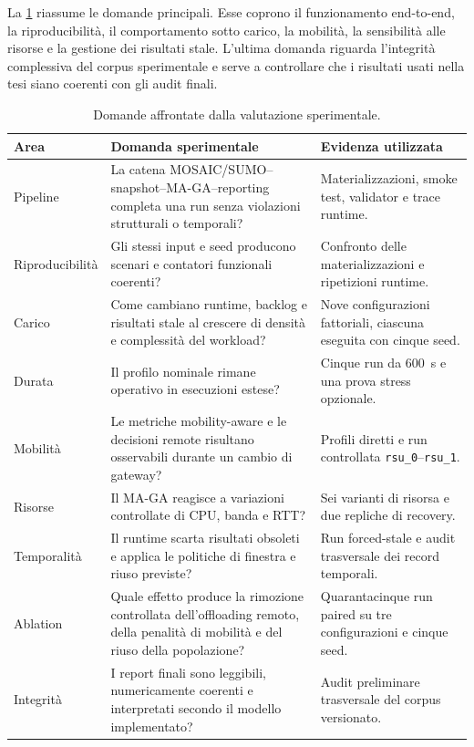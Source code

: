 La \cref{tab:exp_domande} riassume le domande principali. Esse coprono il funzionamento end-to-end, la riproducibilità, il comportamento sotto carico, la mobilità, la sensibilità alle risorse e la gestione dei risultati stale. L'ultima domanda riguarda l'integrità complessiva del corpus sperimentale e serve a controllare che i risultati usati nella tesi siano coerenti con gli audit finali.

\begin{table}[htbp]
    \centering
    \caption{Domande affrontate dalla valutazione sperimentale.}
    \label{tab:exp_domande}
    \small
    \begin{tabularx}{\textwidth}{
        >{\raggedright\arraybackslash}p{}
        >{\raggedright\arraybackslash}X
        >{\raggedright\arraybackslash}p{}
    }
        \toprule
        \textbf{Area} &
        \textbf{Domanda sperimentale} &
        \textbf{Evidenza utilizzata} \\
        \midrule
        Pipeline &
        La catena MOSAIC/SUMO--snapshot--MA-GA--reporting completa una run senza violazioni strutturali o temporali? &
        Materializzazioni, smoke test, validator e trace runtime. \\
        Riproducibilità &
        Gli stessi input e seed producono scenari e contatori funzionali coerenti? &
        Confronto delle materializzazioni e ripetizioni runtime. \\
        Carico &
        Come cambiano runtime, backlog e risultati stale al crescere di densità e complessità del workload? &
        Nove configurazioni fattoriali, ciascuna eseguita con cinque seed. \\
        Durata &
        Il profilo nominale rimane operativo in esecuzioni estese? &
        Cinque run da 600~s e una prova stress opzionale. \\
        Mobilità &
        Le metriche mobility-aware e le decisioni remote risultano osservabili durante un cambio di gateway? &
        Profili diretti e run controllata \texttt{rsu\_0}--\texttt{rsu\_1}. \\
        Risorse &
        Il MA-GA reagisce a variazioni controllate di CPU, banda e RTT? &
        Sei varianti di risorsa e due repliche di recovery. \\
        Temporalità &
        Il runtime scarta risultati obsoleti e applica le politiche di finestra e riuso previste? &
        Run forced-stale e audit trasversale dei record temporali. \\
        Ablation &
        Quale effetto produce la rimozione controllata dell'offloading remoto, della penalità di mobilità e del riuso della popolazione? &
        Quarantacinque run paired su tre configurazioni e cinque seed. \\
        Integrità &
        I report finali sono leggibili, numericamente coerenti e interpretati secondo il modello implementato? &
        Audit preliminare trasversale del corpus versionato. \\
        \bottomrule
    \end{tabularx}
\end{table}

